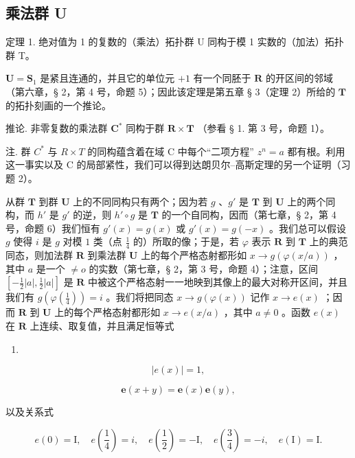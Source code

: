 \subsection{乘法群 U}

定理 1. 绝对值为 1 的复数的（乘法）拓扑群 U 同构于模 1 实数的（加法）拓扑群 T。

\(\mathbf{U} = \mathbf{S}_{1}\) 是紧且连通的，并且它的单位元 \(+1\) 有一个同胚于 \(\mathbf{R}\) 的开区间的邻域（第六章，§ 2，第 4 号，命题 5）；因此该定理是第五章 § 3（定理 2）所给的 \(\mathbf{T}\) 的拓扑刻画的一个推论。

推论. 非零复数的乘法群 \(\mathbf{C}^*\) 同构于群 \(\mathbf{R} \times \mathbf{T}\) （参看 § 1. 第 3 号，命题 1）。

注. 群 \(C^{*}\) 与 \(R \times T\) 的同构蕴含着在域 C 中每个“二项方程” \(z^{n} = a\) 都有根。利用这一事实以及 C 的局部紧性，我们可以得到达朗贝尔–高斯定理的另一个证明（习题 2）。

从群 \(\mathbf{T}\) 到群 \(\mathbf{U}\) 上的不同同构只有两个；因为若 \(g\) 、\(g'\) 是 \(\mathbf{T}\) 到 \(\mathbf{U}\) 上的两个同构，而 \(h'\) 是 \(g'\) 的逆，则 \(h' \circ g\) 是 \(\mathbf{T}\) 的一个自同构，因而（第七章，§ 2，第 4 号，命题 6）我们恒有 \(g'(x) = g(x)\) 或 \(g'(x) = g(-x)\) 。我们总可以假设 \(g\) 使得 \(i\) 是 \(g\) 对模 \(1\) 类（点 \(\frac{1}{4}\) 的）所取的像；于是，若 \(\varphi\) 表示 \(\mathbf{R}\) 到 \(\mathbf{T}\) 上的典范同态，则加法群 \(\mathbf{R}\) 到乘法群 \(\mathbf{U}\) 上的每个严格态射都形如 \(x \to g(\varphi(x/a))\) ，其中 \(a\) 是一个 \(\neq o\) 的实数（第七章，§ 2，第 3 号，命题 4）；注意，区间 \([- \frac{1}{2} |a|, \frac{1}{2} |a|]\) 是 \(\mathbf{R}\) 中被这个严格态射一一地映到其像上的最大对称开区间，并且我们有 \(g(\varphi(\frac{1}{4})) = i\) 。我们将把同态 \(x \to g(\varphi(x))\) 记作 \(x \to e(x)\) ；因而 \(\mathbf{R}\) 到 \(\mathbf{U}\) 上的每个严格态射都形如 \(x \to e(x/a)\) ，其中 \(a \neq 0\) 。函数 \(e(x)\) 在 \(\mathbf{R}\) 上连续、取复值，并且满足恒等式

\begin{enumerate}
\def\labelenumi{(\arabic{enumi})}
\tightlist
\item
\end{enumerate}

\[
\left| e (x) \right| = 1,\tag{2}
\]

\[
\boldsymbol {e} (x + y) = \boldsymbol {e} (x) \boldsymbol {e} (y),
\]

以及关系式

\[
e (0) = \mathrm{I}, \quad e (\frac {1}{4}) = i, \quad e (\frac {1}{2}) = - \mathrm{I}, \quad e (\frac {3}{4}) = - i, \quad e (\mathrm{I}) = \mathrm{I}. \tag {3}
\]

